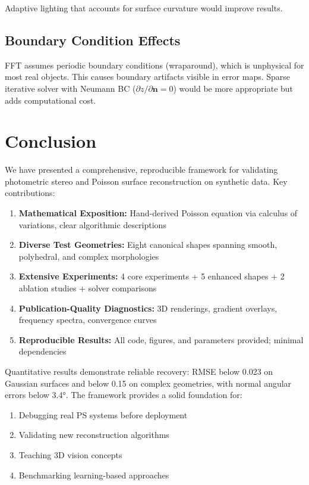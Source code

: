 \documentclass[11pt]{article}
\begin{document}
Adaptive lighting that accounts for surface curvature would improve results.

\subsection{Boundary Condition Effects}

FFT assumes periodic boundary conditions (wraparound), which is unphysical for most real objects. This causes boundary artifacts visible in error maps. Sparse iterative solver with Neumann BC ($\partial z/\partial \mathbf{n} = 0$) would be more appropriate but adds computational cost.


\newpage
\section{Conclusion}\label{sec:conclusion}

We have presented a comprehensive, reproducible framework for validating photometric stereo and Poisson surface reconstruction on synthetic data. Key contributions:

\begin{enumerate}
\item \textbf{Mathematical Exposition:} Hand-derived Poisson equation via calculus of variations, clear algorithmic descriptions
\item \textbf{Diverse Test Geometries:} Eight canonical shapes spanning smooth, polyhedral, and complex morphologies
\item \textbf{Extensive Experiments:} 4 core experiments + 5 enhanced shapes + 2 ablation studies + solver comparisons
\item \textbf{Publication-Quality Diagnostics:} 3D renderings, gradient overlays, frequency spectra, convergence curves
\item \textbf{Reproducible Results:} All code, figures, and parameters provided; minimal dependencies
\end{enumerate}

Quantitative results demonstrate reliable recovery: RMSE below 0.023 on Gaussian surfaces and below 0.15 on complex geometries, with normal angular errors below 3.4°. The framework provides a solid foundation for:

\begin{enumerate}
\item Debugging real PS systems before deployment
\item Validating new reconstruction algorithms
\item Teaching 3D vision concepts
\item Benchmarking learning-based approaches
\end{enumerate}
\end{document}
